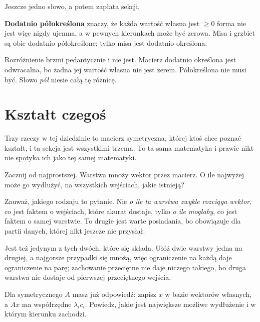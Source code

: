 \begin{fr}
Jeszcze jedno słowo, a potem zapłata sekcji.

\textbf{Dodatnio półokreślona} znaczy, że każda wartość własna jest $\ge 0$
\dash{} forma nie jest więc nigdy ujemna, a w pewnych kierunkach może być
zerowa. Misa i grzbiet są obie dodatnio półokreślone; tylko misa jest dodatnio
określona.

Rozróżnienie brzmi pedantycznie i nie jest. Macierz dodatnio określona jest
odwracalna, bo żadna jej wartość własna nie jest zerem. Półokreślona nie musi
być. Słowo \emph{pół} niesie całą tę różnicę.
\end{fr}

\section{Kształt czegoś}
\label{sec:P10-shape}

\begin{fr}
Trzy rzeczy w tej dziedzinie to macierz symetryczna, której ktoś chce poznać
kształt, i ta sekcja jest wszystkimi trzema. To ta sama matematyka i prawie
nikt nie spotyka ich jako tej samej matematyki.

Zacznij od najprostszej. Warstwa mnoży wektor przez macierz. O ile najwyżej może
go wydłużyć, na wszystkich wejściach, jakie istnieją?

Zauważ, jakiego rodzaju to pytanie. Nie \emph{o ile ta warstwa zwykle rozciąga
wektor}, co jest faktem o wejściach, które akurat dostaje, tylko \emph{o ile
mogłaby}, co jest faktem o samej warstwie. To drugie jest warte posiadania, bo
obowiązuje dla partii danych, której nikt jeszcze nie przysłał.

Jest też jedynym z tych dwóch, które się składa. Ułóż dwie warstwy jedna na
drugiej, a najgorsze przypadki się mnożą, więc ograniczenie na każdą daje
ograniczenie na parę; zachowanie przeciętne nie daje niczego takiego, bo druga
warstwa nie dostaje od pierwszej przeciętnego wejścia.

Dla symetrycznego $A$ masz już odpowiedź: zapisz $x$ w bazie wektorów własnych,
a $Ax$ ma współrzędne $\lambda_ic_i$. Powiedz, jakie jest największe możliwe
wydłużenie i w którym kierunku zachodzi.
\dotline
\nextframe
\end{fr}

